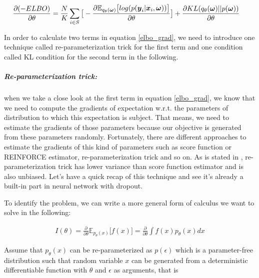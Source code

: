 \begin{equation}
\begin{aligned} \label{elbo_grad}
\frac{\partial (-ELBO)}{\partial \theta} &=\frac{N}{K}\sum_{i \in S}\big[-\frac{\partial \mathbb E_{q_{\theta}(\boldsymbol \omega)} \big[log(p(\boldsymbol y_{i}| \boldsymbol x_{i}, \boldsymbol \omega))\big]}{\partial \theta}\big] + \frac{\partial KL(q_{\theta}(\boldsymbol \omega)||p(\boldsymbol \omega))}{\partial \theta}
\end{aligned}
\end{equation}

In order to calculate two terms in equation \ref{elbo_grad}, we need to introduce one technique called re-parameterization trick\cite{kingma2013auto} for the first term and one condition called KL condition\cite{gal2016uncertainty} for the second term in the following.

\subparagraph{Re-parameterization trick:} when we take a close look at the first term in equation \ref{elbo_grad}, we know that we need to compute the gradients of expectation w.r.t. the parameters of distribution to which this expectation is subject. That means, we need to estimate the gradients of those parameters because our objective is generated from these parameters randomly. Fortunately, there are different approaches to estimate the gradients of this kind of parameters such as score function or REINFORCE estimator\cite{williams1992simple}, re-parameterization trick \cite{kingma2013auto} and so on. As is stated in \cite{kingma2013auto}, re-parameterization trick has lower variance than score function estimator and is also unbiased. Let's have a quick recap of this technique and see it's already a built-in part in neural network with dropout.

To identify the problem, we can write a more general form of calculus we want to solve in the following:

\begin{equation}
\begin{aligned} \label{repa}
I(\theta) = \frac{\partial}{\partial \theta} \mathbb E_{p_{\theta}(x)} \big[ f(x)\big]= \frac{\partial}{\partial \theta} \int f(x) p_{\theta}(x) dx
\end{aligned}
\end{equation} 

Assume that $p_{\theta}(x)$ can be re-parameterized as $p(\epsilon)$ which is a parameter-free distribution such that random variable $x$ can be generated from a deterministic differentiable function with $\theta$ and $\epsilon$ as arguments, that is

